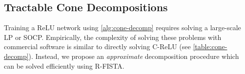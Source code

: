
\subsection{Tractable Cone Decompositions}\label{sec:cone-decomp}

Training a ReLU network using \cref{alg:cone-decomp} requires solving a large-scale LP or SOCP.
Empirically, the complexity of solving these problems with commercial software is similar to directly solving C-ReLU (see \cref{table:cone-decomp}).
Instead, we propose an \emph{approximate} decomposition procedure which
can be solved efficiently using R-FISTA.

